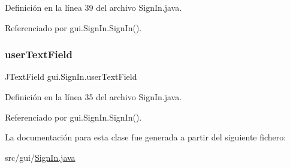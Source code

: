 Definición en la línea 39 del archivo Sign\+In.\+java.



Referenciado por gui.\+Sign\+In.\+Sign\+In().

\mbox{\label{classgui_1_1_sign_in_aff14593606bb17dcdf89b2f2a6699f43}} 
\subsubsection{\texorpdfstring{userTextField}{userTextField}}
{\footnotesize\ttfamily J\+Text\+Field gui.\+Sign\+In.\+user\+Text\+Field\hspace{0.3cm}{\ttfamily [private]}}



Definición en la línea 35 del archivo Sign\+In.\+java.



Referenciado por gui.\+Sign\+In.\+Sign\+In().



La documentación para esta clase fue generada a partir del siguiente fichero\+:\begin{DoxyCompactItemize}
\item 
src/gui/\mbox{\hyperlink{_sign_in_8java}{Sign\+In.\+java}}\end{DoxyCompactItemize}
